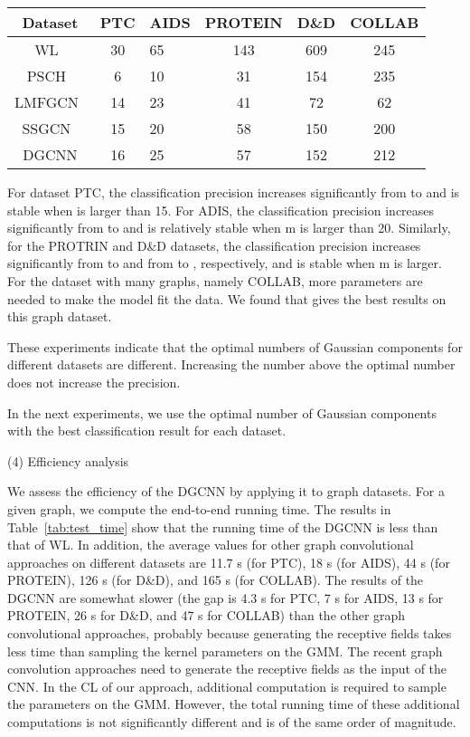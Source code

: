 \documentclass[11pt]{article}
\begin{document}
\begin {table*}
\small
 \caption{\label{tab:test_time}Comparison of running time on five graph datasets (in seconds)} \centering
 \vspace{0.2in}
 \begin{tabular}{cclccc}

  \toprule
  Dataset & PTC & AIDS & PROTEIN & D\&D & COLLAB \\
  \midrule
 WL~\cite{WeisfeilerReduction_26} & 30  & 65 & 143 & 609 & 245 \\
 PSCH~\cite{Niepert2016Learning_10} & 6 & 10 & 31 &154 & 235\\
 LMFGCN~\cite{Duvenaud2015Convolutional} & 14 & 23 & 41 & 72 & 62\\
 SSGCN~\cite{Kipf2016Semi_14} & 15 & 20 & 58 & 150 & 200 \\\hline
 DGCNN & 16 & 25 & 57 & 152 & 212 \\
  \bottomrule
 \end{tabular}
\end{table*}
For dataset PTC, the classification precision increases significantly from  to  and is stable when  is larger than 15. For ADIS, the classification precision increases significantly from  to  and is relatively stable when m is larger than 20. Similarly, for the PROTRIN and D\&D datasets, the classification precision increases significantly from  to  and from  to , respectively, and is stable when m is larger. For the dataset with many graphs, namely COLLAB, more parameters are needed to make the model fit the data. We found that  gives the best results on this graph dataset.

These experiments indicate that the optimal numbers of Gaussian components for different datasets are different. Increasing the number above the optimal number does not increase the precision.

In the next experiments, we use the optimal number of Gaussian components with the best classification result for each dataset.

(4) Efficiency analysis



We assess the efficiency of the DGCNN by applying it to graph datasets. For a given graph, we compute the end-to-end running time. The results in Table~\ref{tab:test_time} show that the running time of the DGCNN is less than that of WL. In addition, the average values for other graph convolutional approaches on different datasets are 11.7 s (for PTC), 18 s (for AIDS), 44 s (for PROTEIN), 126 s (for D\&D), and 165 s (for COLLAB). The results of the DGCNN are somewhat slower (the gap is 4.3 s for PTC, 7 s for AIDS, 13 s for PROTEIN, 26 s for D\&D, and 47 s for COLLAB) than the other graph convolutional approaches, probably because generating the receptive fields takes less time than sampling the kernel parameters on the GMM. The recent graph convolution approaches need to generate the receptive fields as the input of the CNN. In the CL of our approach, additional computation is required to sample the parameters on the GMM. However, the total running time of these additional computations is not significantly different and is of the same order of magnitude.
\end{document}
